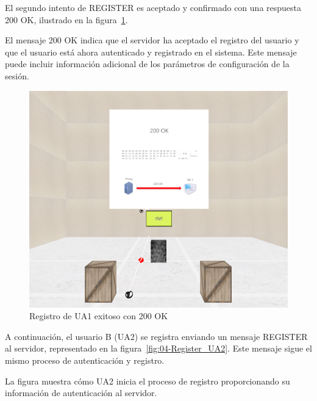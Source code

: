 \documentclass[a4paper, 12pt]{book}
\begin{document}
El segundo intento de REGISTER es aceptado y confirmado con una respuesta 200 OK, ilustrado en la figura~\ref{fig:03-200OK}. 

El mensaje 200 OK indica que el servidor ha aceptado el registro del usuario y que el usuario está ahora autenticado y registrado en el sistema. 
Este mensaje puede incluir información adicional de los parámetros de configuración de la sesión.

\bigskip

\begin{figure}[H]
  \centering
  \includegraphics[width=12cm, keepaspectratio]{img/resultados/02-200OK.PNG}
  \caption{Registro de UA1 exitoso con 200 OK}
  \label{fig:03-200OK}
\end{figure}
\clearpage

A continuación, el usuario B (UA2) se registra enviando un mensaje REGISTER al servidor,
representado en la figura~\ref{fig:04-Register_UA2}. Este mensaje sigue el mismo proceso de autenticación y registro. 

La figura muestra cómo UA2 inicia el proceso de registro proporcionando su información de autenticación al servidor.

\bigskip
\end{document}
